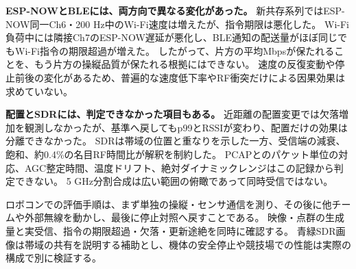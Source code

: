 \documentclass[a4paper,10pt]{ltjsarticle}
\begin{document}
\textbf{ESP-NOWとBLEには、両方向で異なる変化があった。}
新共存系列ではESP-NOW同一Ch6・200 Hz中のWi-Fi速度は増えたが、指令期限は悪化した。
Wi-Fi負荷中には隣接Ch7のESP-NOW遅延が悪化し、BLE通知の配送量がほぼ同じでもWi-Fi指令の期限超過が増えた。
したがって、片方の平均Mbpsが保たれることを、もう片方の操縦品質が保たれる根拠にはできない。
速度の反復変動や停止前後の変化があるため、普遍的な速度低下率やRF衝突だけによる因果効果は求めていない。

\textbf{配置とSDRには、判定できなかった項目もある。}
近距離の配置変更では欠落増加を観測しなかったが、基準へ戻してもp99とRSSIが変わり、配置だけの効果は分離できなかった。
SDRは帯域の位置と重なりを示した一方、受信端の減衰、飽和、約0.4\%の名目RF時間比が解釈を制約した。
PCAPとのパケット単位の対応、AGC整定時間、温度ドリフト、絶対ダイナミックレンジはこの記録から判定できない。
5 GHz分割合成は広い範囲の俯瞰であって同時受信ではない。

ロボコンでの評価手順は、まず単独の操縦・センサ通信を測り、その後に他チームや外部無線を動かし、最後に停止対照へ戻すことである。
映像・点群の生成量と実受信、指令の期限超過・欠落・更新途絶を同時に確認する。
青緑SDR画像は帯域の共有を説明する補助とし、機体の安全停止や競技場での性能は実際の構成で別に検証する。
\end{document}
